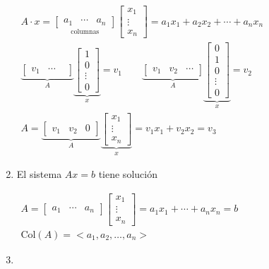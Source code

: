 \begin{enumerate}[label=\color{red}\arabic*), leftmargin=*]
	$\begin{array}{l}
		A\cdot x=\underset{\text{columnas}}{\begin{bmatrix}
			a_1 & \cdots & a_n
	\end{bmatrix}}\begin{bmatrix}
	x_1\\
	\vdots\\
	x_n
\end{bmatrix}=a_1x_1+a_2x_2+\cdots+a_nx_n\\
\underbrace{\begin{bmatrix}
		v_1 & \cdots & 
\end{bmatrix}}_A\underbrace{\begin{bmatrix}
1\\
0\\
\vdots\\
0
\end{bmatrix}}_x=v_1\qquad\underbrace{\begin{bmatrix}
v_1 & v_2 & \cdots
\end{bmatrix}}_{A}\underbrace{\begin{bmatrix}
0 \\
1\\
0\\
\vdots\\
0
\end{bmatrix}}_{x}=v_2\\
A=\underbrace{\begin{bmatrix}
	v_1 & v_2 & 0
\end{bmatrix}}_{A}\underbrace{\begin{bmatrix}
x_1\\
\vdots\\
x_n
\end{bmatrix}}_{x}=v_1x_1+v_2x_2=v_3
	\end{array}$
	\item {}
	
	El sistema $Ax=b$ tiene solución
	
	$\begin{array}{l}
		A=\begin{bmatrix}
			a_1 & \cdots & a_n
		\end{bmatrix}\begin{bmatrix}
		x_1\\
		\vdots\\
		x_n
		\end{bmatrix}=a_1x_1+\cdots+a_nx_n=b\\
		\mathrm{Col}(A)=<a_1,a_2,\dots,a_n>
	\end{array}$
	\item {}
	

\end{enumerate}
